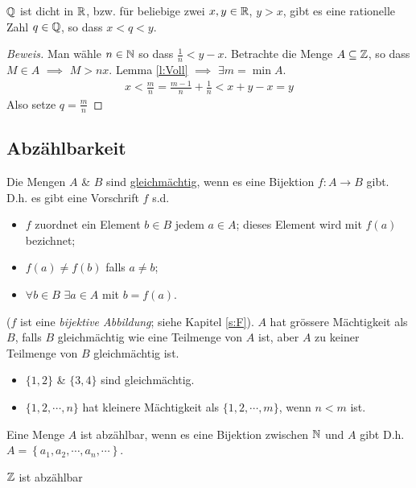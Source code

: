\begin{Sat}
  $\mathbb{Q}$ ist dicht in $\mathbb{R}$, bzw. für beliebige zwei $x,y\in\mathbb{R}$, $y>x$, gibt es eine rationelle Zahl $q\in\mathbb{Q}$, so dass $x<q<y$.
\end{Sat}
\begin{proof}[Beweis]
  Man wähle $n\in\mathbb{N}$ so dass $\frac{1}{n}<y-x$. Betrachte die Menge $A\subseteq\mathbb{Z}$, so dass $M\in A$ $\implies$ $M>nx$. Lemma \ref{l:Voll} $\implies$ $\exists m=\min A$.
  \begin{align*}
    x<\frac{m}{n}=\frac{m-1}{n}+\frac{1}{n}<x+y-x=y
  \end{align*}
  Also setze $q=\frac{m}{n}$
\end{proof}
\subsection{Abzählbarkeit}
\begin{Def}
  Die Mengen $A$ \& $B$ sind \underline{gleichmächtig}, wenn es eine Bijektion $f:A\to B$ gibt. D.h. es gibt eine Vorschrift $f$ s.d.
\begin{itemize}
\item $f$ zuordnet ein Element $b\in B$ jedem $a \in A$; dieses Element wird mit $f(a)$ bezichnet;
\item $f(a)\neq f(b)$ falls $a\neq b$; 
\item $\forall b\in B$ $\exists a\in A$ mit $b= f(a)$.
\end{itemize}
($f$ ist eine {\em bijektive Abbildung}; siehe Kapitel \ref{s:F}).
$A$ hat gr\"ossere Mächtigkeit als $B$, falls $B$ gleichmächtig wie eine Teilmenge von $A$ ist, aber $A$ zu keiner Teilmenge von $B$ gleichmächtig ist.
\end{Def}
\begin{Bsp}
  \begin{itemize}
    \item $\{1,2\}$ \& $\{3,4\}$ sind gleichmächtig.
    \item $\{1,2,\cdots,n\}$ hat kleinere Mächtigkeit als $\{1,2,\cdots,m\}$, wenn $n<m$ ist.
  \end{itemize}
\end{Bsp}
\begin{Def}
  Eine Menge $A$ ist abzählbar, wenn es eine Bijektion zwischen $\mathbb{N}$ und $A$ gibt
D.h. $A=\left\{ a_1,a_2,\cdots,a_n,\cdots \right\}$.
\end{Def}
\begin{Lem}
  $\mathbb{Z}$ ist abzählbar
\end{Lem}
